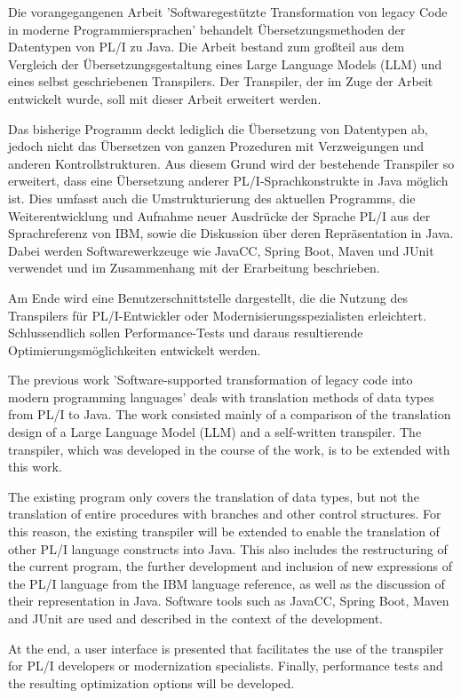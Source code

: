 Die vorangegangenen Arbeit 'Softwaregestützte Transformation von legacy Code in moderne Programmiersprachen' behandelt Übersetzungsmethoden der Datentypen von PL/I zu Java. Die Arbeit bestand zum großteil aus dem Vergleich der Übersetzungsgestaltung eines Large Language Models (LLM) und eines selbst geschriebenen Transpilers. Der Transpiler, der im Zuge der Arbeit entwickelt wurde, soll mit dieser Arbeit erweitert werden.

Das bisherige Programm deckt lediglich die Übersetzung von Datentypen ab, jedoch nicht das Übersetzen von ganzen Prozeduren mit Verzweigungen und anderen Kontrollstrukturen. Aus diesem Grund wird der bestehende Transpiler so erweitert, dass eine Übersetzung anderer PL/I-Sprachkonstrukte in Java möglich ist. Dies umfasst auch die Umstrukturierung des aktuellen Programms, die Weiterentwicklung und Aufnahme neuer Ausdrücke der Sprache PL/I aus der Sprachreferenz von IBM, sowie die Diskussion über deren Repräsentation in Java. Dabei werden Softwarewerkzeuge wie JavaCC, Spring Boot, Maven und JUnit verwendet und im Zusammenhang mit der Erarbeitung beschrieben. 

Am Ende wird eine Benutzerschnittstelle dargestellt, die die Nutzung des Transpilers für PL/I-Entwickler oder Modernisierungsspezialisten erleichtert. Schlussendlich sollen Performance-Tests und daraus resultierende Optimierungsmöglichkeiten entwickelt werden.

The previous work 'Software-supported transformation of legacy code into modern programming languages' deals with translation methods of data types from PL/I to Java. The work consisted mainly of a comparison of the translation design of a Large Language Model (LLM) and a self-written transpiler. The transpiler, which was developed in the course of the work, is to be extended with this work.

The existing program only covers the translation of data types, but not the translation of entire procedures with branches and other control structures. For this reason, the existing transpiler will be extended to enable the translation of other PL/I language constructs into Java. This also includes the restructuring of the current program, the further development and inclusion of new expressions of the PL/I language from the IBM language reference, as well as the discussion of their representation in Java. Software tools such as JavaCC, Spring Boot, Maven and JUnit are used and described in the context of the development. 

At the end, a user interface is presented that facilitates the use of the transpiler for PL/I developers or modernization specialists. Finally, performance tests and the resulting optimization options will be developed.


